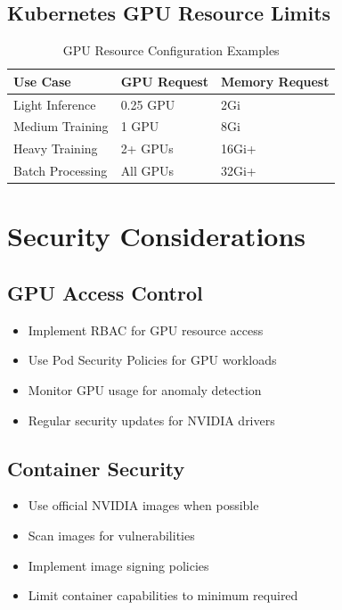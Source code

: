 \documentclass[12pt,a4paper]{report}
\begin{document}
\subsection{Kubernetes GPU Resource Limits}
\begin{table}[h]
    \centering
    \caption{GPU Resource Configuration Examples}
    \label{tab:gpu-config}
    \begin{tabular}{@{}lll@{}}
        \toprule
        \textbf{Use Case} & \textbf{GPU Request} & \textbf{Memory Request} \\
        \midrule
        Light Inference & 0.25 GPU & 2Gi \\
        Medium Training & 1 GPU & 8Gi \\
        Heavy Training & 2+ GPUs & 16Gi+ \\
        Batch Processing & All GPUs & 32Gi+ \\
        \bottomrule
    \end{tabular}
\end{table}

\section{Security Considerations}
\label{sec:security}

\subsection{GPU Access Control}
\begin{itemize}
    \item Implement RBAC for GPU resource access
    \item Use Pod Security Policies for GPU workloads
    \item Monitor GPU usage for anomaly detection
    \item Regular security updates for NVIDIA drivers
\end{itemize}

\subsection{Container Security}
\begin{itemize}
    \item Use official NVIDIA images when possible
    \item Scan images for vulnerabilities
    \item Implement image signing policies
    \item Limit container capabilities to minimum required
\end{itemize}
\end{document}
